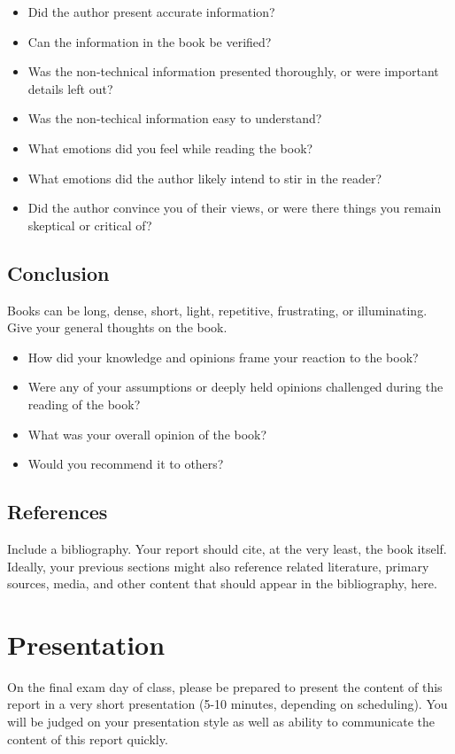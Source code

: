 \documentclass{article}
\begin{document}
\begin{itemize}
        \item Did the author present accurate information? 
	\item Can the information in the book be verified?
	\item Was the non-technical information presented thoroughly, or were important details left out? 
	\item Was the non-techical information easy to understand? 
	\item What emotions did you feel while reading the book?
	\item What emotions did the author likely intend to stir in the reader?
	\item Did the author convince you of their views, or were there things you remain skeptical or critical of?
\end{itemize}

\subsection{Conclusion}
Books can be long, dense, short, light, repetitive, frustrating, or illuminating. Give your general thoughts on the book.
\begin{itemize}
	\item How did your knowledge and opinions frame your reaction to the book? 
	\item Were any of your assumptions or deeply held opinions challenged during the reading of the book? 
	\item What was your overall opinion of the book?
	\item Would you recommend it to others? 
\end{itemize}

\subsection{References}
Include a bibliography. Your report should cite, at the very least, the book itself. Ideally, your previous sections might also reference related literature, primary sources, media, and other content that should appear in the bibliography, here.



\section{Presentation}
On the final exam day of class, please be prepared to present the content of 
this report in a very short presentation (5-10 minutes, depending on 
scheduling). You will be judged on your presentation style as well as ability 
to communicate the content of this report quickly.
\end{document}
